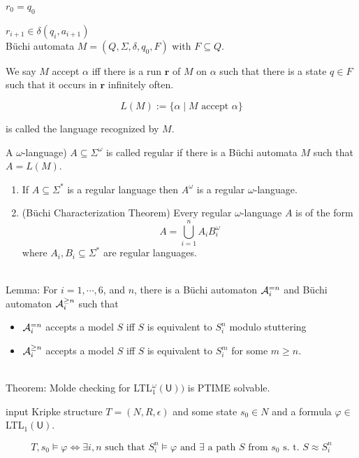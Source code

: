 \documentclass[12pt]{article}
\begin{document}
\begin{CJK*}{GBK}{song}
$r_0=q_0$

$r_{i+1}\in \delta(q_i,a_{i+1})$
\ \\


B\"{u}chi automata $M=(Q,\Sigma,\delta, q_0, F)$ with $F\subseteq Q$.

We say $M$ accept $\alpha$  iff there is a run $\mathbf{r}$ of $M$ on $\alpha$ such that there is a state $q\in F$ such that it occurs in $\mathbf{r}$ infinitely often. 

$$L(M):=\{\alpha\mid M \mbox{ accept } \alpha\}$$ 

is called the language recognized by $M$. 

A $\omega$-language) $A\subseteq \Sigma^{\omega}$ is called regular if there is a B\"{u}chi automata $M$ such that $A=L(M)$.  



\begin{enumerate}
\item If $A\subseteq\Sigma^*$ is a regular language then $A^{\omega}$ is a regular $\omega$-language.

\item (B\"{u}chi Characterization Theorem) Every regular $\omega$-language $A$ is of the form $$A=\bigcup_{i=1}^nA_iB_i^{\omega}$$
where $A_i, B_i\subseteq \Sigma^*$ are regular languages. 
\end{enumerate}
\ \\

Lemma: For $i=1,\cdots,6$, and $n$, there is a B\"{u}chi automaton ${\cal A}_i^{=n}$ and B\"{u}chi automaton ${\cal A}^{\geq n}_i$ such that
\begin{itemize}
\item ${\cal A}_i^{=n}$ accepts a model $S$ iff $S$ is equivalent to $S^n_i$ modulo stuttering
\item ${\cal A}^{\geq n}_i$ accepts a model $S$ iff $S$ is equivalent to $S^m_i$ for some $m\geq n$.
\end{itemize}
\ \\

Theorem: Molde checking for LTL$^\omega_1(\textsf{U}))$ is PTIME solvable.

input Kripke structure $T=(N,R,\epsilon)$ and some state $s_0\in N$ and a formula $\varphi\in $ LTL$_1(\textsf{U})$. 

$$T,s_0\models \varphi  \Longleftrightarrow \exists i,n \mbox{ such that }S_i^n\models \varphi \mbox{ and }\exists \mbox{ a path $S$ from $s_0$ s. t. }S\approx S^n_i$$ 


\end{CJK*}
\end{document}
